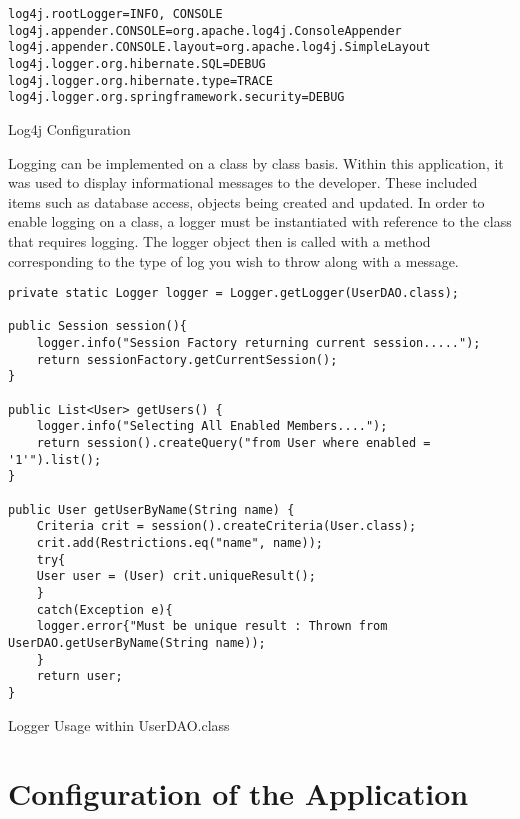\begin{table}[H]
\begin{lstlisting}
log4j.rootLogger=INFO, CONSOLE
log4j.appender.CONSOLE=org.apache.log4j.ConsoleAppender
log4j.appender.CONSOLE.layout=org.apache.log4j.SimpleLayout
log4j.logger.org.hibernate.SQL=DEBUG
log4j.logger.org.hibernate.type=TRACE
log4j.logger.org.springframework.security=DEBUG
\end{lstlisting}
\caption{Log4j Configuration}
\end{table}

Logging can be implemented on a class by class basis. Within this application, it was used to display informational messages to the developer. These included items such as database access, objects being created and updated. In order to enable logging on a class, a logger must be instantiated with reference to the class that requires logging. The logger object then is called with a method corresponding to the type of log you wish to throw along with a message.

\begin{table}[H]
\begin{lstlisting}
private static Logger logger = Logger.getLogger(UserDAO.class);

public Session session(){ 
	logger.info("Session Factory returning current session.....");
	return sessionFactory.getCurrentSession();
}

public List<User> getUsers() {
	logger.info("Selecting All Enabled Members....");
	return session().createQuery("from User where enabled = '1'").list();
}

public User getUserByName(String name) {
	Criteria crit = session().createCriteria(User.class);
	crit.add(Restrictions.eq("name", name)); 
	try{
	User user = (User) crit.uniqueResult();
	}
	catch(Exception e){
	logger.error{"Must be unique result : Thrown from UserDAO.getUserByName(String name));
	}
	return user;
}
\end{lstlisting}
\caption{Logger Usage within UserDAO.class}
\end{table}

\section{Configuration of the Application}

